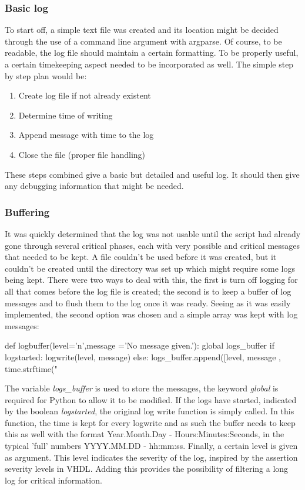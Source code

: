 \documentclass[11pt,british]{article}
\begin{document}
\subsubsection{Basic log}
To start off, a simple text file was created and its location might be decided through the use of a command line argument with argparse. Of course, to be readable, the log file should maintain a certain formatting. To be properly useful, a certain timekeeping aspect needed to be incorporated as well. The simple step by step plan would be:
\begin{enumerate}[itemsep=-0.1cm]
\item Create log file if not already existent
\item Determine time of writing
\item Append message with time to the log
\item Close the file (proper file handling)
\end{enumerate}
These steps combined give a basic but detailed and useful log. It should then give any debugging information that might be needed.

\subsubsection{Buffering}
\label{subsubsec:buffering}
It was quickly determined that the log was not usable until the script had already gone through several critical phases, each with very possible and critical messages that needed to be kept. A file couldn't be used before it was created, but it couldn't be created until the directory was set up which might require some logs being kept. There were two ways to deal with this, the first is turn off logging for all that comes before the log file is created; the second is to keep a buffer of log messages and to flush them to the log once it was ready. Seeing as it was easily implemented, the second option was chosen and a simple array was kept with log messages:
\begin{python}
def logbuffer(level='n',message ='No message given.'):
    global logs_buffer 
    if logstarted:
        logwrite(level, message)
    else:
        logs_buffer.append([level, message
        					, time.strftime("%
\end{python}
The variable \emph{logs\_buffer} is used to store the messages, the keyword \emph{global} is required for Python to allow it to be modified. If the logs have started, indicated by the boolean \emph{logstarted}, the original log write function is simply called. In this function, the time is kept for every logwrite and as such the buffer needs to keep this as well with the format Year.Month.Day - Hours:Minutes:Seconds, in the typical 'full' numbers YYYY.MM.DD - hh:mm:ss. Finally, a certain level is given as argument. This level indicates the severity of the log, inspired by the assertion severity levels in \gls{VHDL}. Adding this provides the possibility of filtering a long log for critical information.
\end{document}
